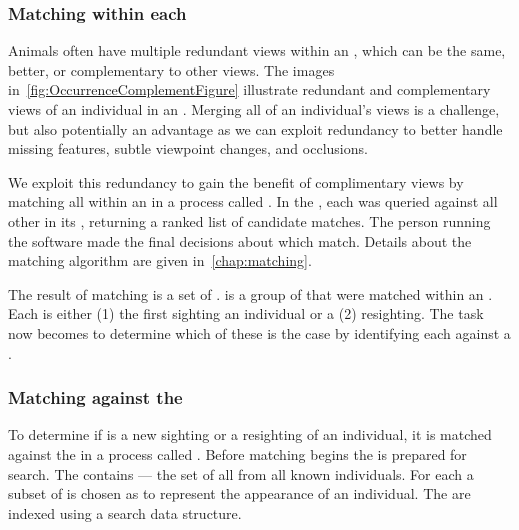         \subsubsection{Matching within each \occurrence{}} %
            Animals often have multiple redundant views within an
              \occurrence{}, which can be the same, better, or
              complementary to other views.
            The images in~\cref{fig:OccurrenceComplementFigure}
              illustrate redundant and complementary views of an
              individual in an \occurrence{}.
            Merging all of an individual's views is a challenge, but
              also potentially an advantage as we can exploit redundancy
              to better handle missing features, subtle viewpoint
              changes, and occlusions.

            We exploit this redundancy to gain the benefit of
              complimentary views by matching all \annots{} within an
              \occurrence{} in a process called
              .
            In the \GZC{}, each \annot{} was queried against all
              other \annots{} in its \occurrence{}, returning a ranked
              list of candidate matches.
            The person running the software made the final decisions
              about which \annots{} match.
            Details about the matching algorithm are given
              in~\cref{chap:matching}.

            The result of \intraoccurrence{} matching is a set of
              \glossterm{\encounters{}}.
            \Aan{\encounter{}} is a group of \annots{} that were
              matched within an \occurrence{}.
            Each \encounter{} is either
            (1) the first sighting an individual or a
            (2) resighting.
            The task now becomes to determine which of these is the
              case by identifying each \encounter{} against a
              \masterdatabase{}.

            \OccurrenceComplementFigure{}
 
        \subsubsection{Matching against the \masterdatabase{}} %
            To determine if \aan{\encounter{}} is a new sighting or a
              resighting of an individual, it is matched against the
              \masterdatabase{} in a process called
              .
            Before matching begins the \masterdatabase{} is prepared
              for search.
            The \masterdatabase{} contains \glossterm{\masternames{}}
              --- the set of all \annots{} from all known individuals.
            For each \mastername{} a subset of \annots{} is chosen as
              \glossterm{\exemplars{}} to represent the appearance of an
              individual.
            The \exemplars{} are indexed using a search data structure.


